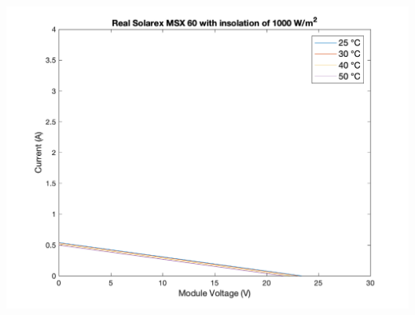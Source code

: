 \documentclass[fleqn]{article}
\begin{document}
\begin{enumerate}
  \begin{center}
    \includegraphics[width=0.75\linewidth]{1000W-r2.png}
  \end{center}
\end{enumerate}

\appendix
\setcounter{secnumdepth}{0}
\end{document}
